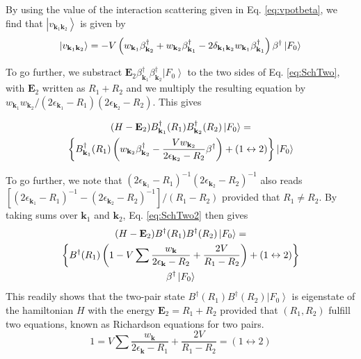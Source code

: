 \documentclass[aps,prb,superscriptaddress,twocolumn]{revtex4}
\begin{document}
By using the value of the interaction scattering given in Eq.%
\eqref{eq:vpotbeta}, we find that $\left|v_{\mathbf{k} _1\mathbf{k}
_2}\right> $ is given by 
\begin{equation}
\left|v_{\mathbf{k} _1\mathbf{k} _2}\right> =-V\left(w_{\mathbf{k}
_1}\beta^{\dagger}_{\mathbf{k} _2}+w_{\mathbf{k} _2}\beta^{\dagger}_{\mathbf{%
k} _1}-2\delta_{\mathbf{k} _1\mathbf{k} _2}w_{\mathbf{k} _1}\beta^{\dagger}_{%
\mathbf{k} _1}\right) \beta^{\dagger}\left|F_0\right>  
\end{equation}

To go further, we substract $\mathbf{E} _2\beta^{\dagger}_{\mathbf{k}
_1}\beta^{\dagger}_{\mathbf{k} _2}\left|F_0\right>  $ to the two sides of Eq.%
\eqref{eq:SchTwo}, with $\mathbf{E} _2$ written as $R_1+R_2$ and we multiply
the resulting equation by $w_{\mathbf{k} _1}w_{\mathbf{k} _2}/\left(2%
\epsilon_{\mathbf{k} _1}-R_1\right) \left(2\epsilon_{\mathbf{k}
_2}-R_2\right) $. This gives

\begin{multline}  \label{eq:SchTwo2}
(H-\mathbf{E} _2)B^{\dagger}_{\mathbf{k} _1}(R_1)B^{\dagger}_{\mathbf{k}
_2}(R_2)\left|F_0\right>   = \\
\left\{B^{\dagger}_{\mathbf{k} _1}(R_1)\left(w_{\mathbf{k}
_2}\beta^{\dagger}_{\mathbf{k} _2}-\frac{Vw_{\mathbf{k} _2}}{2\epsilon_{%
\mathbf{k} _2}-R_2}\beta^{\dagger}\right)  +(1\leftrightarrow2)\right\}
\left|F_0\right>  
\end{multline}

To go further, we note that $\left(2\epsilon_{\mathbf{k} _1}-R_1\right)
^{-1}\left(2\epsilon_{\mathbf{k} _2}-R_2\right) ^{-1}$ also reads $\left[%
\left(2\epsilon_{\mathbf{k} _1}-R_1\right) ^{-1}-\left(2\epsilon_{\mathbf{k}
_2}-R_2\right) ^{-1}\right] /\left(R_1-R_2\right) $ provided that $R_1\neq{}%
R_2$. By taking sums over $\mathbf{k} _1$ and $\mathbf{k} _2$, Eq. %
\eqref{eq:SchTwo2} then gives 
\begin{multline}  \label{eq:SchTwo3}
(H-\mathbf{E} _2)B^{\dagger}(R_1)B^{\dagger}(R_2)\left|F_0\right>   = \\
\left\{B^{\dagger}(R_1)\left(1-V\sum\frac{w_{\mathbf{k} }}{2\epsilon_{%
\mathbf{k} }-R_2}+\frac{2V}{R_1-R_2}\right) +(1\leftrightarrow2)\right\}  \\
\beta^{\dagger}\left|F_0\right>  
\end{multline}
This readily shows that the two-pair state $B^{\dagger}(R_1)B^{\dagger}(R_2)%
\left|F_0\right>  $ is eigenstate of the hamiltonian $H$ with the energy $%
\mathbf{E} _2=R_1+R_2$ provided that $\left(R_1,R_2\right) $ fulfill two
equations, known as Richardson equations for two pairs. 
\begin{equation}
1=V\sum\frac{w_{\mathbf{k} }}{2\epsilon_{\mathbf{k} }-R_1}+\frac{2V}{R_1-R_2}%
=(1\leftrightarrow2)
\end{equation}
\end{document}
